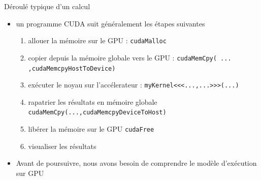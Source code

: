 \documentclass[11pt,mathserif]{beamer}
\newcommand{\argi}{\faLightbulbO}
\newcommand{\geldi}{\faHandPaperO}
\begin{document}
\begin{frame}{Déroulé typique d'un calcul}
  \lstset{basicstyle=\ttfamily}
\pause
  \begin{itemize}[<+->]
    \item[\argi] un programme CUDA suit généralement les étapes suivantes 
\begin{enumerate}[<+->]
 \item allouer la mémoire sur le GPU : \lstinline!cudaMalloc!
 \item copier depuis la mémoire globale vers le GPU : \lstinline!cudaMemCpy( ... ,cudaMemcpyHostToDevice)!
 \item exécuter le noyau sur l'accélerateur : \lstinline!myKernel<<<...,...>>>(...)!
 \item rapatrier les résultats en mémoire globale \lstinline!cudaMemCpy(...,cudaMemcpyDeviceToHost)!
 \item libérer la mémoire sur le GPU \lstinline!cudaFree!
 \item visualiser les résultats
\end{enumerate}
\item[\geldi] Avant de poursuivre, nous avons besoin de comprendre le modèle d'exécution sur GPU
\end{itemize}
\end{frame}
\end{document}
